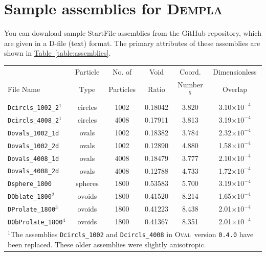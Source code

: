 \documentclass[letterpaper,11pt]{article}
\newcommand{\Oval}{\textsc{Oval}}
\newcommand{\Dempla}{\textsc{Dempla}}
\newcommand{\StartFile}{\textsf{StartFile}}
\begin{document}
\section{Sample assemblies for \Dempla}\label{sec:samples}
You can download sample \textsf{StartFile} assemblies
from the GitHub repository, 
which are given in a D-file (text) format.
The primary attributes of these assemblies 
are shown in
\hyperref[table:assemblies]{Table~\ref*{table:assemblies}}.
%
\begin{table}
\centering
\begin{tabular}{lccccc}
\hline
\hline
          & Particle & No. of & Void  & Coord. & Dimensionless \\
File Name &   Type   & Particles & Ratio &   Number$^{5}$    &  Overlap      \\
\hline
\texttt{Dcircls\_1002\_2}$^{1}$&circles&1002&0.18042 &3.820 & 3.10$\times10^{-4}$\\
\texttt{Dcircls\_4008\_2}$^{1}$&circles&4008&0.17911 &3.813 & 3.19$\times10^{-4}$\\
\texttt{Dovals\_1002\_1d}      &ovals  &1002&0.18382 &3.784 & 2.32$\times10^{-4}$\\
\texttt{Dovals\_1002\_2d}      &ovals  &1002&0.12890 &4.880 & 1.58$\times10^{-4}$\\
\texttt{Dovals\_4008\_1d}      &ovals  &4008&0.18479 &3.777 & 2.10$\times10^{-4}$\\
\texttt{Dovals\_4008\_2d}      &ovals  &4008&0.12788 &4.733 & 1.72$\times10^{-4}$\\
\texttt{Dsphere\_1800}         &spheres&1800&0.53583 &5.700 & 3.19$\times10^{-4}$\\
\texttt{DOblate\_1800}$^{2}$   &ovoids &1800&0.41520 &8.214 & 1.65$\times10^{-4}$\\
\texttt{DProlate\_1800}$^{3}$  &ovoids &1800&0.41223 &8.438 & 2.01$\times10^{-4}$\\
\texttt{DObProlate\_1800}$^{4}$&ovoids &1800&0.41367 &8.351 & 2.01$\times10^{-4}$\\
\hline
\multicolumn{6}{l}{\parbox{4.80in}{%
$^{1}$The assemblies \texttt{Dcircls\_1002} and 
 \texttt{Dcircls\_4008} in \Oval\ version \texttt{0.4.0} have been
replaced.  These older assemblies were slightly anisotropic.}}\\

\end{tabular}
\end{table}
\end{document}

